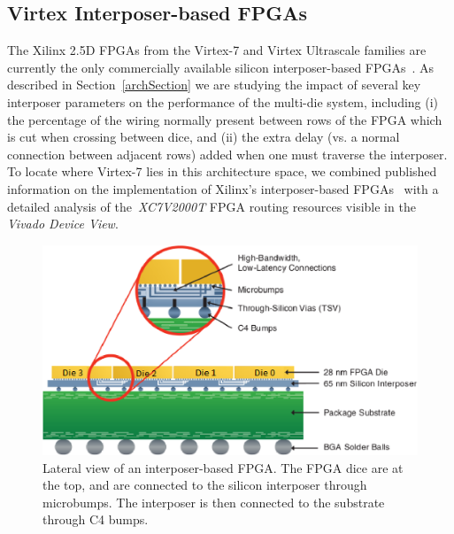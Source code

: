 \documentclass[journal]{IEEEtran}
\begin{document}
\subsection{Virtex Interposer-based FPGAs}
\label{virtex7section}

The Xilinx 2.5D FPGAs from the Virtex-7 and Virtex Ultrascale families are currently the only commercially available silicon interposer-based FPGAs~\cite{xilinxWP}. As described in Section~\ref{archSection} we are studying the impact of several key interposer parameters on the performance of the multi-die system, including (i) the percentage of the wiring normally present between rows of the FPGA which is cut when crossing between dice, and (ii) the extra delay (vs. a normal connection between adjacent rows) added when one must traverse the interposer.  To locate where Virtex-7 lies in this architecture space, we combined published information on the implementation of Xilinx's interposer-based FPGAs~\cite{xilinxTSV} with a detailed analysis of the~\textit{XC7V2000T} FPGA routing resources visible in the \textit{Vivado Device View}.

\begin{figure}[!htbp]
\centering
\includegraphics[width=\linewidth]{interposer.eps}
\caption{Lateral view of an interposer-based FPGA\cite{xilinxWP}. The FPGA dice are at the top, and are connected to the silicon interposer through microbumps. The interposer is then connected to the substrate through C4 bumps.}
\label{fig:interposer}
\end{figure}

\end{document}
